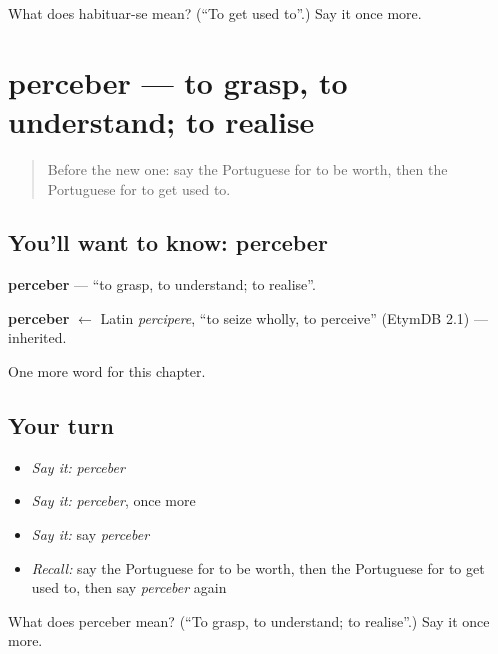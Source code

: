 \begin{tcolorbox}[breakable,colback=teal!4,colframe=teal!35!black,title={Before you move on}]
What does habituar-se mean? (\textquotedblleft{}To get used to\textquotedblright{}.) Say it once more.
\end{tcolorbox}
\section[perceber]{perceber — to grasp, to understand; to realise}

\label{lesson:PT-C177-perceber}



\begin{quote}
Before the new one: say the Portuguese for to be worth, then the Portuguese for to get used to.
\end{quote}

\subsection*{You'll want to know: perceber}
\textbf{perceber} — \textquotedblleft{}to grasp, to understand; to realise\textquotedblright{}.

\begin{cousinweb}
\textbf{perceber} $\leftarrow$ Latin \emph{percipere}, \textquotedblleft{}to seize wholly, to perceive\textquotedblright{} (EtymDB 2.1) — inherited.
\end{cousinweb}

\begin{grammarlens}[title={What you've built}]
One more word for this chapter.
\end{grammarlens}

\subsection*{Your turn}
\begin{itemize}
\raggedright
  \item \emph{Say it:} \emph{perceber}
  \item \emph{Say it:} \emph{perceber}, once more
  \item \emph{Say it:} say \emph{perceber}
  \item \emph{Recall:} say the Portuguese for to be worth, then the Portuguese for to get used to, then say \emph{perceber} again
\end{itemize}

\begin{tcolorbox}[breakable,colback=teal!4,colframe=teal!35!black,title={Before you move on}]
What does perceber mean? (\textquotedblleft{}To grasp, to understand; to realise\textquotedblright{}.) Say it once more.
\end{tcolorbox}

